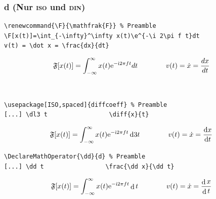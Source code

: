 \documentclass[handout]{beamer}
\DeclareMathOperator{\dd}{d}
\newcommand{\e}{\mathrm{e}}
\renewcommand{\i}{\mathrm{i}}
\begin{document}
\begin{frame}[fragile]
    \frametitle{d (Nur \textsc{iso} und \textsc{din})}
    \begin{wrong}
        \begin{lstlisting}
\renewcommand{\F}{\mathfrak{F}} % Preamble
\F[x(t)]=\int_{-\infty}^\infty x(t)\e^{-\i 2\pi f t}dt
v(t) = \dot x = \frac{dx}{dt}
        \end{lstlisting}
        \begin{equation*}
            \F[x(t)]=\int_{-\infty}^\infty x(t) \e^{-\i 2 \pi f t} d t
            \qquad\qquad
            v(t) = \dot x = \frac{dx}{dt}
        \end{equation*}
    \end{wrong}\\[2ex]
    \pause

    \begin{lstlisting}
\usepackage[ISO,spaced]{diffcoeff} % Preamble
[...] \dl3 t                 \diff{x}{t}
        \end{lstlisting}
    \begin{equation*}
        \F[x(t)]=\int_{-\infty}^\infty x(t)\e^{-\i 2 \pi f t}\dl3 t
        \qquad\qquad
        v(t) = \dot x = \diff{x}{t}
    \end{equation*}
    \pause

    \begin{lstlisting}
\DeclareMathOperator{\dd}{d} % Preamble
[...] \dd t                 \frac{\dd x}{\dd t}
        \end{lstlisting}
    \begin{equation*}
        \F[x(t)]=\int_{-\infty}^\infty x(t)\e^{-\i 2\pi f t}\dd t
        \qquad\qquad
        v(t) = \dot x = \frac{\dd x}{\dd t}
    \end{equation*}
\end{frame}
\end{document}
